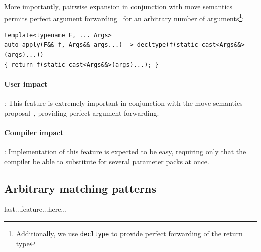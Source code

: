 \documentclass{article}
\begin{document}
More importantly, pairwise expansion in conjunction with move
semantics~\cite{Hinnant02} permits perfect argument
forwarding~\cite{Dimov02} for an arbitrary number of
arguments\footnote{Additionally, we use \texttt{decltype} to provide
  perfect forwarding of the return type}:

\begin{verbatim}
template<typename F, ... Args>
auto apply(F&& f, Args&& args...) -> decltype(f(static_cast<Args&&>(args)...))
{ return f(static_cast<Args&&>(args)...); }
\end{verbatim}


%
%

\paragraph{User impact}: This feature is extremely important in
conjunction with the move semantics proposal~\cite{Hinnant02},
providing perfect argument forwarding. 

\paragraph{Compiler impact}: Implementation of this feature is
expected to be easy, requiring only that the compiler
be able to substitute for several parameter packs at once.

\subsection{Arbitrary matching patterns}
last...feature...here...
\end{document}
